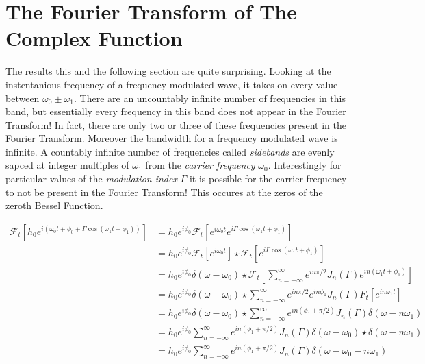\documentclass[onecolumn, groupedaddress, 10pt]{revtex4-1}
\begin{document}
\appendix
\section{The Fourier Transform of The Complex Function}
The results this and the following section are quite surprising.  Looking at the instentanious frequency of a frequency modulated wave, it takes on every value between $\omega_0 \pm \omega_1$.  There are an uncountably infinite number of frequencies in this band, but essentially every frequency in this band does not appear in the Fourier Transform!  In fact, there are only two or three of these frequencies present in the Fourier Transform.  Moreover the bandwidth for a frequency modulated wave is infinite.  A countably infinite number of frequencies called \textit{sidebands} are evenly sapced at integer multiples of $\omega_1$ from the \textit{carrier frequency} $\omega_0$.  Interestingly for particular values of the \textit{modulation index} $\Gamma$ it is possible for the carrier frequency to not be present in the Fourier Transform!  This occures at the zeros of the zeroth Bessel Function.

\begin{align}
\mathcal{F}_t \left[ h_0 e^{i\left( \omega_0 t + \phi_0 + \Gamma \cos( \omega_1 t + \phi_1 ) \right)} \right]
&= h_0 e^{i\phi_0} \mathcal{F}_t \left[ e^{i\omega_0 t} e^{i\Gamma \cos(\omega_1 t + \phi_1)} \right]											\\
&= h_0 e^{i\phi_0} \mathcal{F}_t \left[ e^{i\omega_0 t} \right] \star \mathcal{F}_t \left[ e^{i\Gamma \cos(\omega_1 t + \phi_1)} \right]		\\
&= h_0 e^{i\phi_0} \delta(\omega - \omega_0) 
			\star \mathcal{F}_t \left[ \sum_{n=-\infty}^{\infty} e^{in\pi/2} J_n(\Gamma) e^{in(\omega_1 t + \phi_1)} \right]							\\
&= h_0 e^{i\phi_0} \delta(\omega - \omega_0) \star \sum_{n=-\infty}^{\infty} e^{in\pi/2} e^{in\phi_1} J_n(\Gamma) F_t \left[ e^{in\omega_1 t} \right]	\\
&= h_0 e^{i\phi_0} \delta(\omega - \omega_0) \star \sum_{n=-\infty}^{\infty} e^{in(\phi_1 + \pi/2)} J_n(\Gamma) \delta(\omega - n\omega_1)			\\
&= h_0 e^{i\phi_0} \sum_{n=-\infty}^{\infty} e^{in(\phi_1 + \pi/2)} J_n(\Gamma)  \delta(\omega - \omega_0) \star \delta(\omega - n\omega_1)			\\
&= h_0 e^{i\phi_0} \sum_{n=-\infty}^{\infty} e^{in(\phi_1 + \pi/2)} J_n(\Gamma)  \delta(\omega - \omega_0 - n\omega_1)
\end{align}
\end{document}
